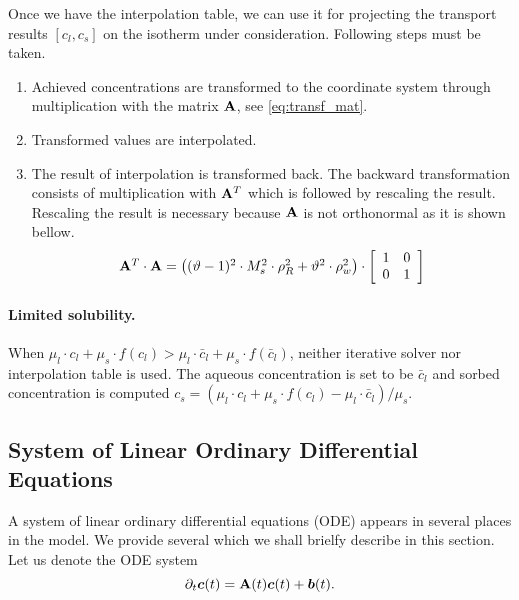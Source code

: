 Once we have the interpolation table, we can use it for projecting the transport results ${[c_l,c_s]}$ on the 
isotherm under consideration. Following steps must be taken.
\begin{enumerate}
 \item Achieved concentrations are transformed to the coordinate system through multiplication with the 
       matrix ${\bf A}$, see \eqref{eq:transf_mat}.
 \item Transformed values are interpolated.
 \item The result of interpolation is transformed back. The backward transformation consists of multiplication 
       with ${\bf A}^T$ which is followed by rescaling the result. Rescaling the result is necessary because  
       ${\bf A}$ is not orthonormal as it is shown bellow.
 \[
 \begin{array}{l}
 {\bf A}^T\cdot{\bf A} =
  \left((\vartheta - 1)^2\cdot M_s^2\cdot \rho_R^2 + \vartheta^2\cdot \rho_w^2\right)\cdot\left[\begin{array}{cc}
    1 & 0\\
    0 & 1
  \end{array}\right]
  \end{array}
 \]
\end{enumerate}


\paragraph{Limited solubility.} When $\mu_l\cdot c_l + \mu_s\cdot f(c_l) > \mu_l\cdot \bar{c}_l + \mu_s\cdot f(\bar{c}_l)$, neither iterative 
solver nor interpolation table is used. The aqueous concentration is set to be $\bar{c}_l$ and sorbed 
concentration is computed $c_s = (\mu_l\cdot c_l + \mu_s\cdot f(c_l) - \mu_l\cdot \bar{c}_l)/\mu_s$.

\subsection{System of Linear Ordinary Differential Equations}
\label{sec:num_slode}

A system of linear ordinary differential equations (ODE) appears in several places in the model. We provide 
several  which we shall brielfy describe in this section. Let us denote 
the ODE system
\[
  \partial_t \mathbf{\boldsymbol{c}}(t) = \mathbf{A}(t) \mathbf{\boldsymbol{c}}(t) + \mathbf{\boldsymbol{b}}(t).
\]

